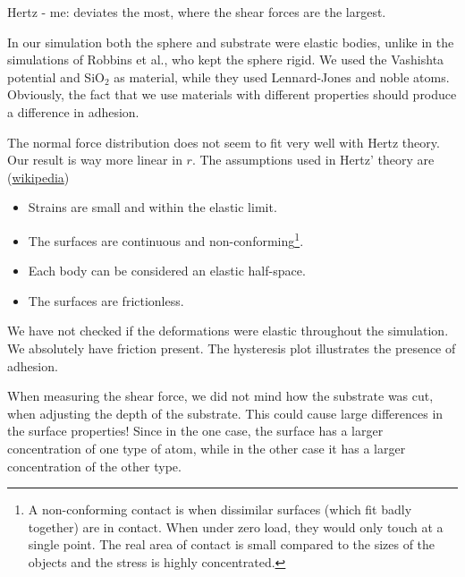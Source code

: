 \documentclass[twoside,english]{uiofysmaster}
\begin{document}
  

Hertz - me: deviates the most, where the shear forces are the largest.

In our simulation both the sphere and substrate were elastic bodies, unlike in the simulations of Robbins et al., who kept the sphere rigid. 
We used the Vashishta potential and SiO$_2$ as material, while they used Lennard-Jones and noble atoms. 
Obviously, the fact that we use materials with different properties should produce a difference in adhesion.


The normal force distribution does not seem to fit very well with Hertz theory.
Our result is way more linear in $r$. 
The assumptions used in Hertz' theory are (\href{https://en.wikipedia.org/wiki/Contact_mechanics}{wikipedia})
\begin{itemize}
	\item Strains are small and within the elastic limit.
	\item The surfaces are continuous and non-conforming\footnote{
A non-conforming contact is when dissimilar surfaces (which fit badly together) are in contact. When under zero load, they would only touch at a single point. 
The real area of contact is small compared to the sizes of the objects and the stress is highly concentrated.}.
	\item Each body can be considered an elastic half-space.
	\item The surfaces are frictionless.
\end{itemize}

We have not checked if the deformations were elastic throughout the simulation.
We absolutely have friction present.
The hysteresis plot illustrates the presence of adhesion.
 




When measuring the shear force, we did not mind how the substrate was cut, when adjusting the depth of the substrate.
This could cause large differences in the surface properties! 
Since in the one case, the surface has a larger concentration of one type of atom, while in the other case it has a larger concentration of the other type. 
\end{document}
